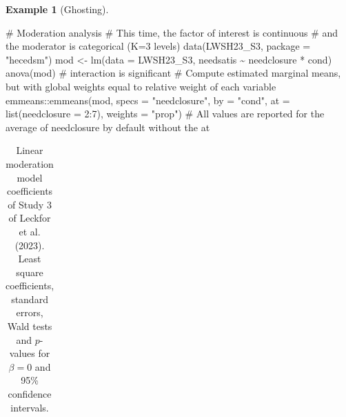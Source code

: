 \documentclass[
  11pt,
  letterpaper,
]{scrbook}
\newenvironment{Shaded}{\begin{snugshade}}{\end{snugshade}}
\newcommand{\AttributeTok}[1]{\textcolor[rgb]{0.40,0.45,0.13}{#1}}
\newcommand{\CommentTok}[1]{\textcolor[rgb]{0.37,0.37,0.37}{#1}}
\newcommand{\DecValTok}[1]{\textcolor[rgb]{0.68,0.00,0.00}{#1}}
\newcommand{\FunctionTok}[1]{\textcolor[rgb]{0.28,0.35,0.67}{#1}}
\newcommand{\NormalTok}[1]{\textcolor[rgb]{0.00,0.23,0.31}{#1}}
\newcommand{\OtherTok}[1]{\textcolor[rgb]{0.00,0.23,0.31}{#1}}
\newcommand{\SpecialCharTok}[1]{\textcolor[rgb]{0.37,0.37,0.37}{#1}}
\newcommand{\StringTok}[1]{\textcolor[rgb]{0.13,0.47,0.30}{#1}}
\theoremstyle{definition}
\newtheorem{example}{Example}[chapter]
\theoremstyle{definition}
\theoremstyle{remark}
\begin{document}
\begin{example}[Ghosting]
\begin{Shaded}
\begin{Highlighting}[]
\CommentTok{\# Moderation analysis}
\CommentTok{\# This time, the factor of interest is continuous}
\CommentTok{\# and the moderator is categorical (K=3 levels)}
\FunctionTok{data}\NormalTok{(LWSH23\_S3, }\AttributeTok{package =} \StringTok{"hecedsm"}\NormalTok{)}
\NormalTok{mod }\OtherTok{\textless{}{-}} \FunctionTok{lm}\NormalTok{(}\AttributeTok{data =}\NormalTok{ LWSH23\_S3, needsatis }\SpecialCharTok{\textasciitilde{}}\NormalTok{ needclosure }\SpecialCharTok{*}\NormalTok{ cond)}
\FunctionTok{anova}\NormalTok{(mod) }\CommentTok{\# interaction is significant}
\CommentTok{\# Compute estimated marginal means, but with global weights equal to relative weight of each variable}
\NormalTok{emmeans}\SpecialCharTok{::}\FunctionTok{emmeans}\NormalTok{(mod, }\AttributeTok{specs =} \StringTok{"needclosure"}\NormalTok{, }
                 \AttributeTok{by =} \StringTok{"cond"}\NormalTok{, }
                 \AttributeTok{at =} \FunctionTok{list}\NormalTok{(}\AttributeTok{needclosure =} \DecValTok{2}\SpecialCharTok{:}\DecValTok{7}\NormalTok{), }
                 \AttributeTok{weights =} \StringTok{"prop"}\NormalTok{)}
\CommentTok{\# All values are reported for the average of needclosure by default without the at}
\end{Highlighting}
\end{Shaded}

\begin{longtable}[]{@{}
  >{\raggedright\arraybackslash}p{}
  >{\centering\arraybackslash}p{}
  >{\centering\arraybackslash}p{}
  >{\centering\arraybackslash}p{}
  >{\centering\arraybackslash}p{}
  >{\centering\arraybackslash}p{}@{}}

\caption{\label{tbl-lmmoder2}Linear moderation model coefficients of
Study 3 of Leckfor et al. (2023). Least square coefficients, standard
errors, Wald tests and \(p\)-values for \(\beta=0\) and 95\% confidence
intervals.}

\tabularnewline


\end{longtable}
\end{example}
\end{document}
